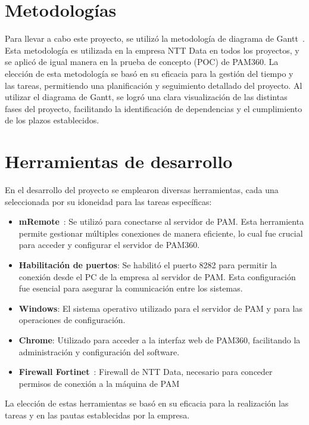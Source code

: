 

\section{Metodologías}

Para llevar a cabo este proyecto, se utilizó la metodología de diagrama de Gantt~\cite{gantt}. Esta metodología es  utilizada en la empresa NTT Data en todos los proyectos, y se aplicó de igual manera en la prueba de concepto (POC) de PAM360. La elección de esta metodología se basó en su eficacia para la gestión del tiempo y las tareas, permitiendo una planificación y seguimiento detallado del proyecto. Al utilizar el diagrama de Gantt, se logró una clara visualización de las distintas fases del proyecto, facilitando la identificación de dependencias y el cumplimiento de los plazos establecidos.

\section{Herramientas de desarrollo}

En el desarrollo del proyecto se emplearon diversas herramientas, cada una seleccionada por su idoneidad para las tareas específicas:

\begin{itemize}
	\item \textbf{mRemote}~\cite{mremoteng}: Se utilizó para conectarse al servidor de PAM. Esta herramienta permite gestionar múltiples conexiones de manera eficiente, lo cual fue crucial para acceder y configurar el servidor de PAM360.
	\item \textbf{Habilitación de puertos}: Se habilitó el puerto 8282 para permitir la conexión desde el PC de la empresa al servidor de PAM. Esta configuración fue esencial para asegurar la comunicación entre los sistemas.
	\item \textbf{Windows}: El sistema operativo utilizado para el servidor de PAM y para las operaciones de configuración.
	\item \textbf{Chrome}: Utilizado para acceder a la interfaz web de PAM360, facilitando la administración y configuración del software.
	\item \textbf{Firewall Fortinet}~\cite{fortinet}: Firewall de NTT Data, necesario para conceder permisos de conexión a la máquina de PAM
\end{itemize}

La elección de estas herramientas se basó en su eficacia para la realización las tareas y en las pautas establecidas por la empresa.

